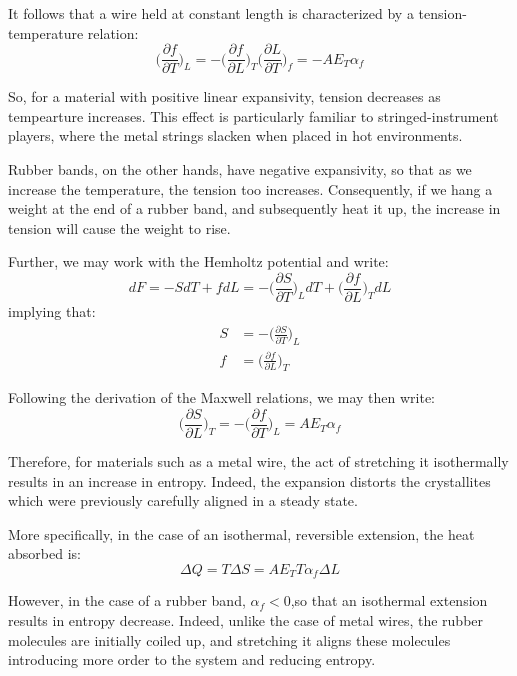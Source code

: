 \documentclass[a4paper,11pt,oneside]{book}
\begin{document}
It follows that a wire held at constant length is characterized by a tension-temperature relation:
\begin{equation}
    \bigg(\frac{\partial f}{\partial T}\bigg)_L = -\bigg(\frac{\partial f}{\partial L}\bigg)_T\bigg(\frac{\partial L}{\partial T}\bigg)_f = -AE_T \alpha_f
\end{equation}

So, for a material with positive linear expansivity, tension decreases as tempearture increases. This effect is particularly familiar to stringed-instrument players, where the metal strings slacken when placed in hot environments. 


Rubber bands, on the other hands, have negative expansivity, so that as we increase the temperature, the tension too increases. Consequently, if we hang a weight at the end of a rubber band, and subsequently heat it up, the increase in tension will cause the weight to rise. 

Further, we may work with the Hemholtz potential and write:
\begin{equation}
    dF = -SdT + fdL = -\bigg(\frac{\partial S}{\partial T}\bigg)_L dT + \bigg(\frac{\partial f}{\partial L}\bigg)_T dL
\end{equation}
implying that:
\begin{align}
    S &= -\bigg(\frac{\partial S}{\partial T}\bigg)_L \\
    f &= \bigg(\frac{\partial f}{\partial L}\bigg)_T
\end{align}

Following the derivation of the Maxwell relations, we may then write:
\begin{equation}
    \bigg(\frac{\partial S}{\partial L}\bigg)_T = -   \bigg(\frac{\partial f}{\partial T}\bigg)_L = A E_T \alpha_f
\end{equation}

Therefore, for materials such as a metal wire, the act of stretching it isothermally results in an increase in entropy. Indeed, the expansion distorts the crystallites which were previously carefully aligned in a steady state. 


More specifically, in the case of an isothermal, reversible extension, the heat absorbed is:
\begin{equation}
    \Delta Q = T \Delta S = A E_T T \alpha_f \Delta L
\end{equation}

However, in the case of a rubber band, $\alpha_f < 0$,so that an isothermal extension results in entropy decrease. Indeed, unlike the case of metal wires, the rubber molecules are initially coiled up, and stretching it aligns these molecules introducing more order to the system and reducing entropy. 
\end{document}
